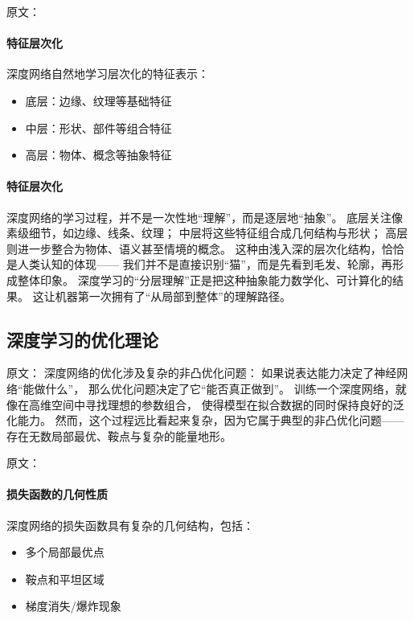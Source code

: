 原文：
\paragraph{特征层次化}
深度网络自然地学习层次化的特征表示：
\begin{itemize}
\item 底层：边缘、纹理等基础特征
\item 中层：形状、部件等组合特征
\item 高层：物体、概念等抽象特征
\end{itemize}
\paragraph{特征层次化}  
深度网络的学习过程，并不是一次性地“理解”，而是逐层地“抽象”。  
底层关注像素级细节，如边缘、线条、纹理；  
中层将这些特征组合成几何结构与形状；  
高层则进一步整合为物体、语义甚至情境的概念。  
这种由浅入深的层次化结构，恰恰是人类认知的体现——  
我们并不是直接识别“猫”，而是先看到毛发、轮廓，再形成整体印象。  
深度学习的“分层理解”正是把这种抽象能力数学化、可计算化的结果。  
这让机器第一次拥有了“从局部到整体”的理解路径。


\subsection{深度学习的优化理论}

原文：
深度网络的优化涉及复杂的非凸优化问题：
如果说表达能力决定了神经网络“能做什么”，  
那么优化问题决定了它“能否真正做到”。  
训练一个深度网络，就像在高维空间中寻找理想的参数组合，  
使得模型在拟合数据的同时保持良好的泛化能力。  
然而，这个过程远比看起来复杂，因为它属于典型的非凸优化问题——  
存在无数局部最优、鞍点与复杂的能量地形。

原文：
\paragraph{损失函数的几何性质}
深度网络的损失函数具有复杂的几何结构，包括：
\begin{itemize}
\item 多个局部最优点
\item 鞍点和平坦区域
\item 梯度消失/爆炸现象
\end{itemize}

